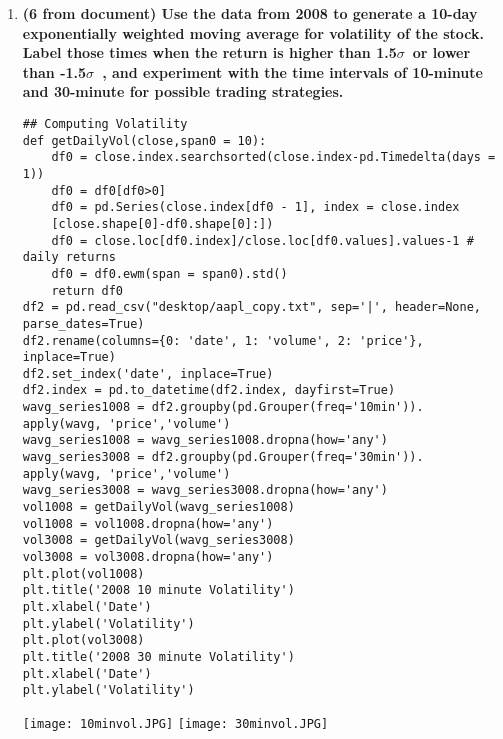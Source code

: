 \documentclass[12pt]{article}
\begin{document}
\begin{enumerate}
\item \textbf{(6 from document) Use the data from 2008 to generate a 10-day exponentially weighted moving average for volatility of the stock. Label those times when the return is higher than 1.5$\sigma$\ or lower than -1.5$\sigma$\ , and experiment with the time intervals of 10-minute and 30-minute for possible trading strategies.}

\begin{verbatim}
## Computing Volatility
def getDailyVol(close,span0 = 10):
    df0 = close.index.searchsorted(close.index-pd.Timedelta(days = 1))
    df0 = df0[df0>0]
    df0 = pd.Series(close.index[df0 - 1], index = close.index
    [close.shape[0]-df0.shape[0]:])
    df0 = close.loc[df0.index]/close.loc[df0.values].values-1 # daily returns
    df0 = df0.ewm(span = span0).std()
    return df0
df2 = pd.read_csv("desktop/aapl_copy.txt", sep='|', header=None, parse_dates=True)
df2.rename(columns={0: 'date', 1: 'volume', 2: 'price'}, inplace=True)
df2.set_index('date', inplace=True)
df2.index = pd.to_datetime(df2.index, dayfirst=True)
wavg_series1008 = df2.groupby(pd.Grouper(freq='10min')).
apply(wavg, 'price','volume')
wavg_series1008 = wavg_series1008.dropna(how='any')
wavg_series3008 = df2.groupby(pd.Grouper(freq='30min')).
apply(wavg, 'price','volume')
wavg_series3008 = wavg_series3008.dropna(how='any')
vol1008 = getDailyVol(wavg_series1008)
vol1008 = vol1008.dropna(how='any')
vol3008 = getDailyVol(wavg_series3008)
vol3008 = vol3008.dropna(how='any')
plt.plot(vol1008)
plt.title('2008 10 minute Volatility')
plt.xlabel('Date')
plt.ylabel('Volatility')
plt.plot(vol3008)
plt.title('2008 30 minute Volatility')
plt.xlabel('Date')
plt.ylabel('Volatility')
\end{verbatim}
\begin{center}
  \texttt{[image: 10minvol.JPG]}
  \texttt{[image: 30minvol.JPG]}
\end{center}


\end{enumerate}
\end{document}
